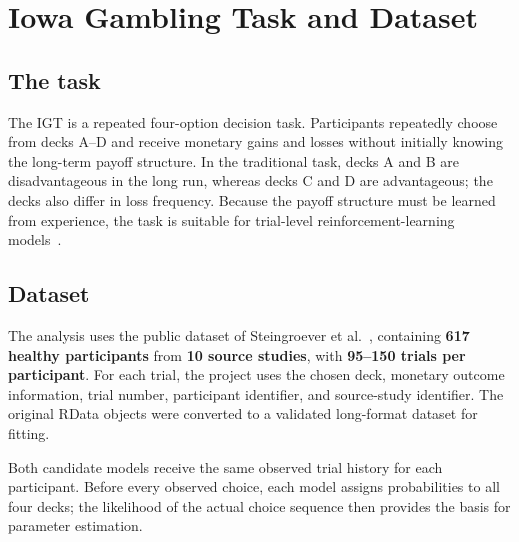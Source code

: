 \section{Iowa Gambling Task and Dataset}
\subsection{The task}

The IGT is a repeated four-option decision task. Participants repeatedly choose from decks A–D and receive monetary gains and losses without initially knowing the long-term payoff structure. In the traditional task, decks A and B are disadvantageous in the long run, whereas decks C and D are advantageous; the decks also differ in loss frequency. Because the payoff structure must be learned from experience, the task is suitable for trial-level reinforcement-learning models~\cite{bechara1994}.

\subsection{Dataset}

The analysis uses the public dataset of Steingroever et al.~\cite{steingroever2015}, containing \textbf{617 healthy participants} from \textbf{10 source studies}, with \textbf{95–150 trials per participant}. For each trial, the project uses the chosen deck, monetary outcome information, trial number, participant identifier, and source-study identifier. The original RData objects were converted to a validated long-format dataset for fitting.

Both candidate models receive the same observed trial history for each participant. Before every observed choice, each model assigns probabilities to all four decks; the likelihood of the actual choice sequence then provides the basis for parameter estimation.
